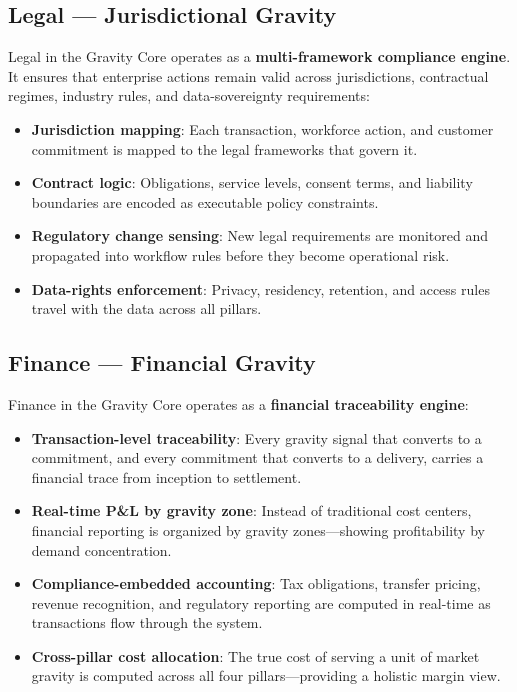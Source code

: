 \documentclass[11pt,a4paper,twocolumn]{article}
\begin{document}
\subsection{Legal --- Jurisdictional Gravity}

Legal in the Gravity Core operates as a \textbf{multi-framework compliance engine}. It ensures that enterprise actions remain valid across jurisdictions, contractual regimes, industry rules, and data-sovereignty requirements:

\begin{itemize}[leftmargin=1.5em]
  \item \textbf{Jurisdiction mapping}: Each transaction, workforce action, and customer commitment is mapped to the legal frameworks that govern it.
  \item \textbf{Contract logic}: Obligations, service levels, consent terms, and liability boundaries are encoded as executable policy constraints.
  \item \textbf{Regulatory change sensing}: New legal requirements are monitored and propagated into workflow rules before they become operational risk.
  \item \textbf{Data-rights enforcement}: Privacy, residency, retention, and access rules travel with the data across all pillars.
\end{itemize}

\subsection{Finance --- Financial Gravity}

Finance in the Gravity Core operates as a \textbf{financial traceability engine}:

\begin{itemize}[leftmargin=1.5em]
  \item \textbf{Transaction-level traceability}: Every gravity signal that converts to a commitment, and every commitment that converts to a delivery, carries a financial trace from inception to settlement.
  \item \textbf{Real-time P\&L by gravity zone}: Instead of traditional cost centers, financial reporting is organized by gravity zones---showing profitability by demand concentration.
  \item \textbf{Compliance-embedded accounting}: Tax obligations, transfer pricing, revenue recognition, and regulatory reporting are computed in real-time as transactions flow through the system.
  \item \textbf{Cross-pillar cost allocation}: The true cost of serving a unit of market gravity is computed across all four pillars---providing a holistic margin view.
\end{itemize}
\end{document}
